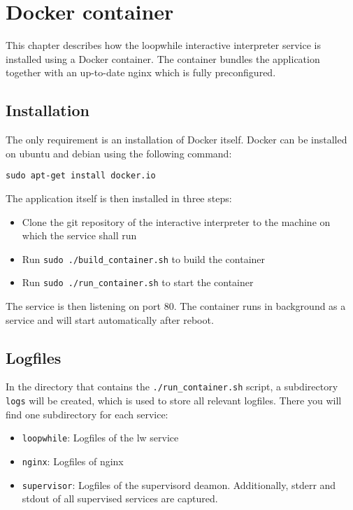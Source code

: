 \chapter{Docker container}
\label{chapter:docker}
This chapter describes how the loopwhile interactive interpreter service
is installed using a Docker container. The container bundles the application
together with an up-to-date nginx which is fully preconfigured.

\section{Installation}
The only requirement is an installation of Docker itself. Docker can be installed on
ubuntu and debian using the following command:

\begin{verbatim}
sudo apt-get install docker.io
\end{verbatim}

The application itself is then installed in three steps:
\begin{itemize}
\item Clone the git repository of the interactive interpreter to the machine
      on which the service shall run
\item Run \verb|sudo ./build_container.sh| to build the container
\item Run \verb|sudo ./run_container.sh| to start the container
\end{itemize}
The service is then listening on port 80. The container runs in background
as a service and will start automatically after reboot.


\section{Logfiles}
In the directory that contains the \verb|./run_container.sh| script, a subdirectory
\verb|logs| will be created, which is used to store all relevant logfiles. There
you will find one subdirectory for each service:
\begin{itemize}
\item \verb|loopwhile|: Logfiles of the lw service
\item \verb|nginx|: Logfiles of nginx
\item \verb|supervisor|: Logfiles of the supervisord deamon. Additionally,
      stderr and stdout of all supervised services are captured.
\end{itemize}
